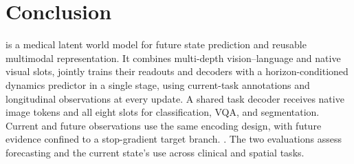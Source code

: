 \section{Conclusion}

\method{} is a medical latent world model for future state prediction and reusable multimodal representation. It combines multi-depth vision--language and native visual slots, jointly trains their readouts and decoders with a horizon-conditioned dynamics predictor in a single stage, using current-task annotations and longitudinal observations at every update. A shared task decoder receives native image tokens and all eight slots for classification, VQA, and segmentation. Current and future observations use the same encoding design, with future evidence confined to a stop-gradient target branch. . The two evaluations assess forecasting and the current state's use across clinical and spatial tasks.
